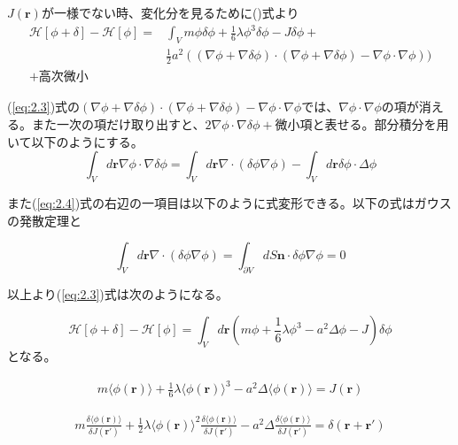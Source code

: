 \documentclass[a4paper,12pt, oneside, openany]{jsbook}
\begin{document}
$J(\boldsymbol{r})$が一様でない時、変化分を見るために()式より
\begin{equation}\label{eq:2.3}
\begin{split}
\mathcal{H}[\phi+\delta]-\mathcal{H}[\phi]=&\int_{V}m\phi\delta\phi+\frac{1}{6}\lambda\phi^3\delta\phi-J\delta\phi+\\
&\frac{1}{2}a^2((\nabla\phi+\nabla\delta\phi)\cdot(\nabla\phi+\nabla\delta\phi)-\nabla\phi\cdot\nabla\phi))\\
+高次微小
\end{split}
\end{equation}

(\ref{eq:2.3})式の$(\nabla\phi+\nabla\delta\phi)\cdot(\nabla\phi+\nabla\delta\phi)-\nabla\phi\cdot\nabla\phi$では、$\nabla\phi\cdot\nabla\phi$の項が消える。また一次の項だけ取り出すと、$2\nabla\phi\cdot\nabla\delta\phi+微小項$と表せる。部分積分を用いて以下のようにする。
\begin{equation}\label{eq:2.4}
\int_Vd\boldsymbol{r}\nabla\phi\cdot\nabla\delta\phi=\int_Vd\boldsymbol{r}\nabla\cdot(\delta\phi\nabla\phi)-\int_Vd\boldsymbol{r}\delta\phi\cdot\Delta\phi
\end{equation}

\indent また(\ref{eq:2.4})式の右辺の一項目は以下のように式変形できる。以下の式はガウスの発散定理と

\begin{equation}
\int_Vd\boldsymbol{r}\nabla\cdot(\delta\phi\nabla\phi)=\int_{\partial V}dS \boldsymbol{n}\cdot\delta\phi\nabla\phi=0
\end{equation}

\indent 以上より(\ref{eq:2.3})式は次のようになる。

\begin{equation}
\mathcal{H}[\phi+\delta]-\mathcal{H}[\phi]=\int_Vd\boldsymbol{r}\left(m\phi+\frac{1}{6}\lambda\phi^3-a^2\Delta\phi-J\right)\delta\phi
\end{equation}
となる。

\begin{align}
m\langle\phi(\boldsymbol{r})\rangle+\frac{1}{6}\lambda\langle\phi(\boldsymbol{r})\rangle^3-a^2\Delta\langle\phi(\boldsymbol{r})\rangle=J(\boldsymbol{r})
\end{align}

\begin{align}\label{B}
m\frac{\delta\langle\phi(\boldsymbol{r})\rangle}{\delta J(\boldsymbol{r'})}+\frac{1}{2}\lambda\langle\phi(\boldsymbol{r})\rangle^2\frac{\delta\langle\phi(\boldsymbol{r})\rangle}{\delta J(\boldsymbol{r'})}-a^2\Delta\frac{\delta\langle\phi(\boldsymbol{r})\rangle}{\delta J(\boldsymbol{r'})}=\delta(\boldsymbol{r+r'})
\end{align}
\newpage
\end{document}
